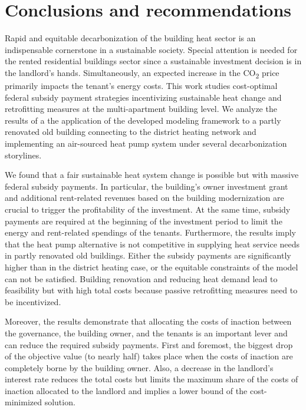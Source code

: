 \section{Conclusions and recommendations}\label{conclusions}
Rapid and equitable decarbonization of the building heat sector is an indispensable cornerstone in a sustainable society. Special attention is needed for the rented residential buildings sector since a sustainable investment decision is in the landlord's hands. Simultaneously, an expected increase in the CO\textsubscript{2} price primarily impacts the tenant's energy costs. This work studies cost-optimal federal subsidy payment strategies incentivizing sustainable heat change and retrofitting measures at the multi-apartment building level. We analyze the results of a the application of the developed modeling framework to a partly renovated old building connecting to the district heating network and implementing an air-sourced heat pump system under several decarbonization storylines.\vspace{0.5cm}

We found that a fair sustainable heat system change is possible but with massive federal subsidy payments. In particular, the building's owner investment grant and additional rent-related revenues based on the building modernization are crucial to trigger the profitability of the investment. At the same time, subsidy payments are required at the beginning of the investment period to limit the energy and rent-related spendings of the tenants. Furthermore, the results imply that the heat pump alternative is not competitive in supplying heat service needs in partly renovated old buildings. Either the subsidy payments are significantly higher than in the district heating case, or the equitable constraints of the model can not be satisfied. Building renovation and reducing heat demand lead to feasibility but with high total costs because passive retrofitting measures need to be incentivized.\vspace{0.5cm}

Moreover, the results demonstrate that allocating the costs of inaction between the governance, the building owner, and the tenants is an important lever and can reduce the required subsidy payments. First and foremost, the biggest drop of the objective value (to nearly half) takes place when the costs of inaction are completely borne by the building owner. Also, a decrease in the landlord's interest rate reduces the total costs but limits the maximum share of the costs of inaction allocated to the landlord and implies a lower bound of the cost-minimized solution.\vspace{0.5cm}


